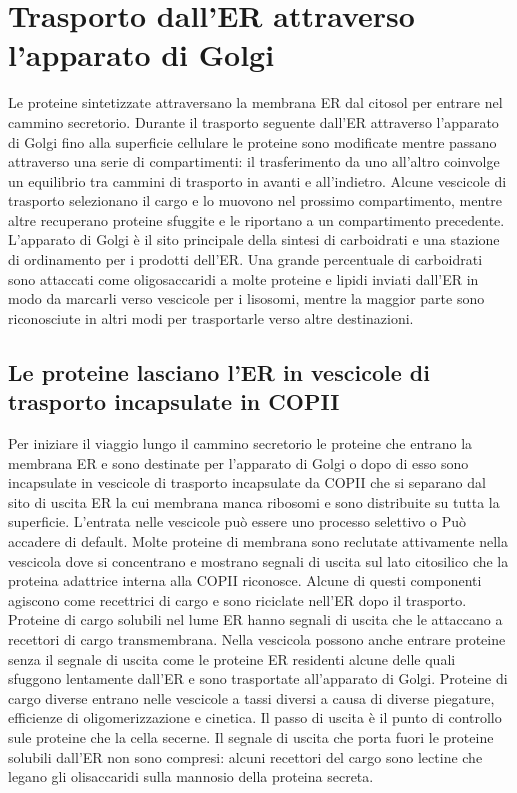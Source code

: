 \section{Trasporto dall'ER attraverso l'apparato di Golgi}
Le proteine sintetizzate attraversano la membrana ER dal citosol per entrare nel cammino secretorio. Durante il trasporto seguente dall'ER attraverso l'apparato di Golgi fino alla
superficie cellulare le proteine sono modificate mentre passano attraverso una serie di compartimenti: il trasferimento da uno all'altro coinvolge un equilibrio tra cammini di
trasporto in avanti e all'indietro. Alcune vescicole di trasporto selezionano il cargo e lo muovono nel prossimo compartimento, mentre altre recuperano proteine sfuggite e le
riportano a un compartimento precedente. L'apparato di Golgi \`e il sito principale della sintesi di carboidrati e una stazione di ordinamento per i prodotti dell'ER. Una grande
percentuale di carboidrati sono attaccati come oligosaccaridi a molte proteine e lipidi inviati dall'ER in modo da marcarli verso vescicole per i lisosomi, mentre la maggior parte
sono riconosciute in altri modi per trasportarle verso altre destinazioni.
\subsection{Le proteine lasciano l'ER in vescicole di trasporto incapsulate in COPII}
Per iniziare il viaggio lungo il cammino secretorio le proteine che entrano la membrana ER e sono destinate per l'apparato di Golgi o dopo di esso sono incapsulate in vescicole di 
trasporto incapsulate da COPII che si separano dal sito di uscita ER la cui membrana manca ribosomi e sono distribuite su tutta la superficie. L'entrata nelle vescicole pu\`o essere
uno processo selettivo o Pu\`o accadere di default. Molte proteine di membrana sono reclutate attivamente nella vescicola dove si concentrano e mostrano segnali di uscita sul lato 
citosilico che la proteina adattrice interna alla COPII riconosce. Alcune di questi componenti agiscono come recettrici di cargo e sono riciclate nell'ER dopo il trasporto. Proteine
di cargo solubili nel lume ER hanno segnali di uscita che le attaccano a recettori di cargo transmembrana. Nella vescicola possono anche entrare proteine senza il segnale di uscita come
le proteine ER residenti alcune delle quali sfuggono lentamente dall'ER e sono trasportate all'apparato di Golgi. Proteine di cargo diverse entrano nelle vescicole a tassi diversi
a causa di diverse piegature, efficienze di oligomerizzazione e cinetica. Il passo di uscita \`e il punto di controllo sule proteine che la cella secerne. Il segnale di uscita che 
porta fuori le proteine solubili dall'ER non sono compresi: alcuni recettori del cargo sono lectine che legano gli olisaccaridi sulla mannosio della proteina secreta.
